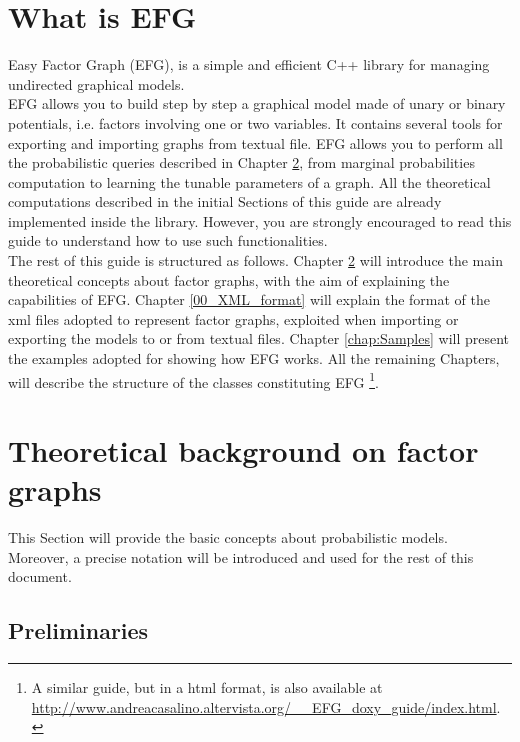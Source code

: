 \chapter{What is EFG}

Easy Factor Graph (EFG), is a simple and efficient C++ library for managing undirected graphical models. 
\\
EFG allows you to build step by step a graphical model made of unary or binary potentials, i.e. factors involving one or two variables.
It contains several tools for exporting and importing graphs from textual file. EFG allows you to perform all the probabilistic queries described in Chapter \ref{chap:theory}, from
marginal probabilities computation to learning the tunable parameters of a graph.
All the theoretical computations described in the initial Sections of this guide are already implemented inside the library. However, you are strongly encouraged to read this guide to understand how to use such functionalities.
\\
The rest of this guide is structured as follows. Chapter \ref{chap:theory} will introduce the main theoretical concepts about factor graphs, with the aim of explaining the capabilities of 
EFG. Chapter \ref{00_XML_format} will explain the format of the xml files adopted to represent factor graphs, exploited when importing or exporting the models to or from
textual files. Chapter \ref{chap:Samples} will present the examples adopted for showing how EFG works. All the remaining Chapters, will describe the structure of the classes constituting EFG 
\footnote{A similar guide, but in a html format, is also available at \url{http://www.andreacasalino.altervista.org/__EFG_doxy_guide/index.html}.}.

\newpage
\chapter{Theoretical background on factor graphs}
\label{chap:theory}

This Section will provide the basic concepts about probabilistic models.
Moreover, a precise notation will be introduced and used for the rest of this document. 

\section{Preliminaries}
\label{sec:00:PREL}

